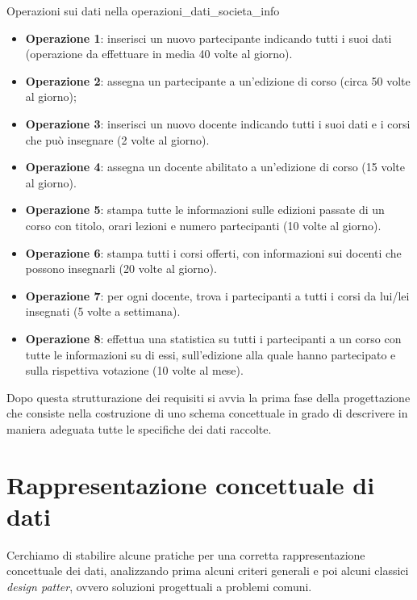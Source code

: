 \documentclass[12pt]{report}
\newcommand{\namerefl}[1]{%
	\bgroup
	\let\nmu\MakeLowercase
	\nameref{#1}\egroup}
\newcommand{\nmu}{}
\begin{document}
 	\begin{example}{\nmu Operazioni sui dati nella \namerefl{exa:societa_formazione}}{operazioni_dati_societa_info}
 		\begin{itemize}
 			\item \textbf{Operazione 1}: inserisci un nuovo partecipante indicando tutti i suoi dati (operazione da effettuare in media 40 volte al giorno).
 			\item \textbf{Operazione 2}: assegna un partecipante a un'edizione di corso (circa 50 volte al giorno);
 			\item \textbf{Operazione 3}: inserisci un nuovo docente indicando tutti i suoi dati e i corsi che può insegnare (2 volte al giorno).
 			\item \textbf{Operazione 4}: assegna un docente abilitato a un'edizione di corso (15 volte al giorno).
 			\item \textbf{Operazione 5}: stampa tutte le informazioni sulle edizioni passate di un corso con titolo, orari lezioni e numero partecipanti (10 volte al giorno).
 			\item \textbf{Operazione 6}: stampa tutti i corsi offerti, con informazioni sui docenti che possono insegnarli (20 volte al giorno).
 			\item \textbf{Operazione 7}: per ogni docente, trova i partecipanti a tutti i corsi da lui/lei insegnati (5 volte a settimana).
 			\item \textbf{Operazione 8}: effettua una statistica su tutti i partecipanti a un corso con tutte le informazioni su di essi, sull'edizione alla quale hanno partecipato e sulla rispettiva votazione (10 volte al mese).
 		\end{itemize}
 	\end{example}
 	Dopo questa strutturazione dei requisiti si avvia la prima fase della progettazione che consiste nella costruzione di uno schema concettuale in grado di descrivere in maniera adeguata tutte le specifiche dei dati raccolte.
 	\section{Rappresentazione concettuale di dati}
 	Cerchiamo di stabilire alcune pratiche per una corretta rappresentazione concettuale dei dati, analizzando prima alcuni criteri generali e poi alcuni classici \textit{design patter}, ovvero soluzioni progettuali a problemi comuni.
\end{document}
